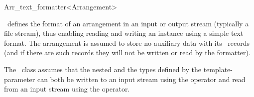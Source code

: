 
\ccRefPageBegin

\begin{ccRefClass}{Arr_text_formatter<Arrangement>}

\ccDefinition

\ccRefName\ defines the format of an arrangement in an input or output stream
(typically a file stream), thus enabling reading and writing an 
instance using a simple text format. The arrangement is assumed to store no auxiliary
data with its \dcel\ records (and if there are such records they will not be written
or read by the formatter).

The \ccRefName\ class assumes that the nested  and the  types
defined by the  template-parameter can both be written to an input
stream using the \ccc{<<} operator and read from an input stream using the \ccc{>>}
operator.


\ccIsModel
     \\

\ccSeeAlso
     \\

\end{ccRefClass}

\ccRefPageEnd
